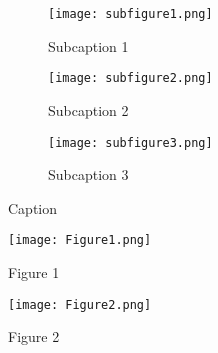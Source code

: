 
\begin{figure}[h] %
    \centering
    \begin{subfigure}[t]{.32\textwidth}
        \texttt{[image: subfigure1.png]}
        \caption{Subcaption 1}
        \label{fig:subfigure1}
    \end{subfigure}
    \begin{subfigure}[t]{.32\textwidth}
        \texttt{[image: subfigure2.png]}
        \caption{Subcaption 2}
        \label{fig:subfigure2}
    \end{subfigure}
    \begin{subfigure}[t]{.32\textwidth}
        \texttt{[image: subfigure3.png]}
        \caption{Subcaption 3}
        \label{fig:subfigure3}
    \end{subfigure}
    \caption{Caption}
    \label{fig:figures}
\end{figure}

\begin{figure}[h] %
    \centering
    \begin{minipage}[t]{0.49\linewidth}
        \texttt{[image: Figure1.png]}
        \caption{Figure 1}
        \label{fig:figure1}
    \end{minipage}
    \begin{minipage}[t]{0.49\linewidth}
        \texttt{[image: Figure2.png]}
        \caption{Figure 2}
        \label{fig:figure2}
    \end{minipage}
\end{figure}

